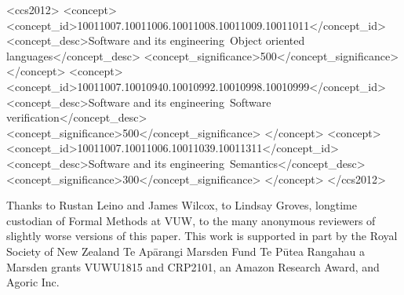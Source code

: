 \documentclass[sigconf,screen,balance]{acmart}
\begin{document}
\begin{CCSXML}
<ccs2012>
   <concept>
       <concept_id>10011007.10011006.10011008.10011009.10011011</concept_id>
       <concept_desc>Software and its engineering~Object oriented languages</concept_desc>
       <concept_significance>500</concept_significance>
       </concept>
   <concept>
       <concept_id>10011007.10010940.10010992.10010998.10010999</concept_id>
       <concept_desc>Software and its engineering~Software verification</concept_desc>
       <concept_significance>500</concept_significance>
       </concept>
   <concept>
       <concept_id>10011007.10011006.10011039.10011311</concept_id>
       <concept_desc>Software and its engineering~Semantics</concept_desc>
       <concept_significance>300</concept_significance>
       </concept>
 </ccs2012>
\end{CCSXML}


\maketitle
%
%
%




%




\balance




\begin{acks}
Thanks to Rustan Leino and James Wilcox, 
to Lindsay Groves, longtime custodian of Formal Methods at VUW,
to the many anonymous reviewers of slightly worse versions of this paper.
%
%
This work is supported in part by the Royal Society of New Zealand Te Ap\={a}rangi  Marsden Fund Te P\={u}tea Rangahau a Marsden grants VUWU1815 and CRP2101, an Amazon Research Award, and Agoric Inc.
\end{acks}

\pagebreak






%
\end{document}
